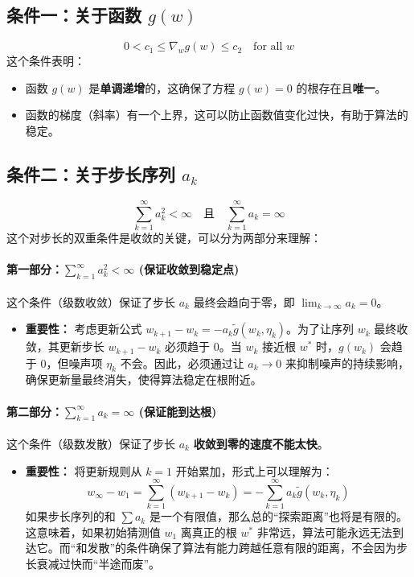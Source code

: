 \documentclass[12pt, a4paper]{article}
\begin{document}
\subsection{条件一：关于函数 $g(w)$}
\[ 
0 < c_1 \le \nabla_w g(w) \le c_2 \quad \text{for all } w 
\]
这个条件表明：
\begin{itemize}
    \item 函数 $g(w)$ 是\textbf{单调递增}的，这确保了方程 $g(w)=0$ 的根存在且\textbf{唯一}。
    \item 函数的梯度（斜率）有一个上界，这可以防止函数值变化过快，有助于算法的稳定。
\end{itemize}

\subsection{条件二：关于步长序列 $a_k$}
\[ 
\sum_{k=1}^{\infty} a_k^2 < \infty \quad \text{且} \quad \sum_{k=1}^{\infty} a_k = \infty 
\]
这个对步长的双重条件是收敛的关键，可以分为两部分来理解：

\paragraph{第一部分：$\sum_{k=1}^{\infty} a_k^2 < \infty$ (保证收敛到稳定点)}
这个条件（级数收敛）保证了步长 $a_k$ 最终会趋向于零，即 $\lim_{k \to \infty} a_k = 0$。
\begin{itemize}
    \item \textbf{重要性：} 考虑更新公式 $w_{k+1} - w_k = -a_k \tilde{g}(w_k, \eta_k)$。为了让序列 $w_k$ 最终收敛，其更新步长 $w_{k+1} - w_k$ 必须趋于 0。当 $w_k$ 接近根 $w^*$ 时，$g(w_k)$ 会趋于 0，但噪声项 $\eta_k$ 不会。因此，必须通过让 $a_k \to 0$ 来抑制噪声的持续影响，确保更新量最终消失，使得算法稳定在根附近。
\end{itemize}

\paragraph{第二部分：$\sum_{k=1}^{\infty} a_k = \infty$ (保证能到达根)}
这个条件（级数发散）保证了步长 $a_k$ \textbf{收敛到零的速度不能太快}。
\begin{itemize}
    \item \textbf{重要性：} 将更新规则从 $k=1$ 开始累加，形式上可以理解为：
    \[ 
    w_{\infty} - w_1 = \sum_{k=1}^{\infty} (w_{k+1} - w_k) = - \sum_{k=1}^{\infty} a_k \tilde{g}(w_k, \eta_k) 
    \]
    如果步长序列的和 $\sum a_k$ 是一个有限值，那么总的“探索距离”也将是有限的。这意味着，如果初始猜测值 $w_1$ 离真正的根 $w^*$ 非常远，算法可能永远无法到达它。而“和发散”的条件确保了算法有能力跨越任意有限的距离，不会因为步长衰减过快而“半途而废”。
\end{itemize}
\end{document}
